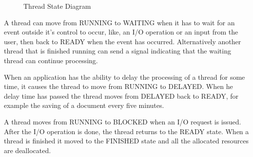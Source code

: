 \documentclass[12pt letter]{report}
\begin{document}
\begin{figure}[htpb]
  \centering
  \caption{Thread State Diagram}
\end{figure}

A thread can move from RUNNING to WAITING when it has to wait for an
event outside it's control to occur, like, an I/O operation or an
input from the user, then back to READY when the event has occurred.
Alternatively another thread that is finished running can send a
signal indicating that the waiting thread can continue processing.

When an application has the ability to delay the processing of a
thread for some time, it causes the thread to move from RUNNING to
DELAYED. When he delay time has passed the thread moves from DELAYED
back to READY, for example the saving of a document every five minutes.

A thread moves from RUNNING to BLOCKED when an I/O request is issued.
After the I/O operation is done, the thread returns to the READY
state. When a thread is finished it moved to the FINISHED state and
all the allocated resources are deallocated.
\end{document}
